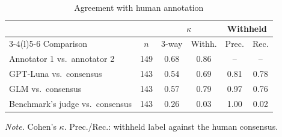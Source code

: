 \begin{table}[!t]
\caption{Agreement with human annotation}
\label{tab:human}
\centering\footnotesize
\setlength{\tabcolsep}{3pt}
\begin{tabular}{@{}lccccc@{}}
\toprule
 & & \multicolumn{2}{c}{$\kappa$} & \multicolumn{2}{c}{Withheld} \\
\cmidrule(lr){3-4}\cmidrule(l){5-6}
Comparison & $n$ & 3-way & Withh. & Prec. & Rec. \\
\midrule
Annotator 1 vs.\ annotator 2 & 149 & 0.68 & 0.86 & -- & -- \\
\midrule
GPT-Luna vs.\ consensus & 143 & 0.54 & 0.69 & 0.81 & 0.78 \\
GLM vs.\ consensus & 143 & 0.57 & 0.79 & 0.97 & 0.76 \\
Benchmark's judge vs.\ consensus & 143 & 0.26 & 0.03 & 1.00 & 0.02 \\
\bottomrule
\end{tabular}
\par\vspace{2pt}\parbox{\columnwidth}{\scriptsize\textit{Note.} Cohen's $\kappa$. Prec./Rec.: withheld label against the human consensus.}
\end{table}
